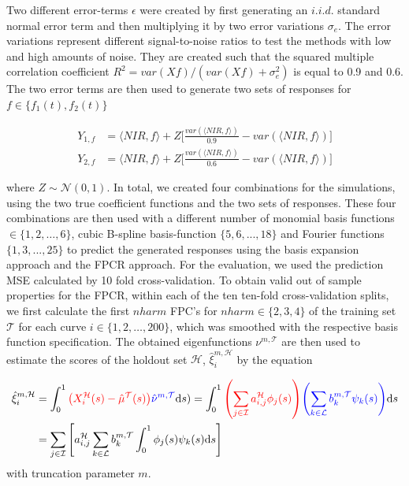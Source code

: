 \documentclass[11pt,twoside,a4paper]{article}
\begin{document}
		 Two different error-terms $\epsilon$ were created by first generating an $i.i.d.$ standard normal error term and then multiplying it by two error variations $\sigma_e $. The error variations represent different signal-to-noise ratios to test the methods with low and high amounts of noise. They are created such that the squared multiple correlation coefficient $R^2 = var(Xf) / (var(Xf) + \sigma^2_{e})$ is equal to 0.9 and 0.6. The two error terms are then used to generate two sets of responses for $f \in \{f_1(t), f_2(t)\}$
		
		\begin{equation}
			\begin{split}
				Y_{1,f} & = \langle NIR, f\rangle + Z  \biggl\lbrack\frac{var(\langle NIR, f\rangle)}{0.9} - var(\langle NIR, f\rangle)\biggr\rbrack \\
				Y_{2,f} & = \langle NIR, f\rangle + Z  \biggl\lbrack\frac{var(\langle NIR, f\rangle)}{0.6} - var(\langle NIR, f\rangle)\biggr\rbrack
			\end{split}
		\end{equation}
		
		where $Z \sim \mathcal{N}(0,1)$. In total, we created four combinations for the simulations, using the two true coefficient functions and the two sets of responses. These four combinations are then used with a different number of monomial basis functions $ \in \{1,2, \dots, 6\}$, cubic B-spline basis-function $\{5,6,...,18\}$ and Fourier functions $\{1,3,...,25\}$ to predict the generated responses using the basis expansion approach and the FPCR approach. For the evaluation, we used the prediction MSE calculated by 10 fold cross-validation.
		To obtain valid out of sample properties for the FPCR, within each of the ten ten-fold cross-validation splits, we first calculate the first $nharm$ FPC's for $nharm \in \{2,3,4\}$ of the training set $\mathcal{T}$ for each curve $i \in \{1,2, \dots, 200\}$, which was smoothed with the respective basis function specification. The obtained eigenfunctions $\nu^{m,\mathcal{T}}$ are then used to estimate the scores of the holdout set $\mathcal{H}$, $\hat{\xi}_{i}^{m, \mathcal{H}}$  by the equation
		 
		\begin{equation}
			\begin{split}
				\hat{\xi}_{i}^{m, \mathcal{H}} &=  \int_{0}^{1} {\color{red} \left(X_{i}^{\mathcal{H}}(s) - \hat{\mu}^{\mathcal{T}}(s)\right)} {\color{blue}\hat{\nu}^{m, \mathcal{T}} }\mathrm{d}s) 
			    = \int_{0}^{1} {\color{red}\left(\sum_{j \in \mathcal{I}} a_{i,j}^{\mathcal{H}} \phi_j(s)\right)} {\color{blue}\left(\sum_{k \in \mathcal{L}} b_{k}^{m, \mathcal{T}} \psi_{k}(s)\right)} \mathrm{d}s \\
				 &= \sum_{j \in \mathcal{I}} \left[ a_{i,j}^{\mathcal{H}}\sum_{k \in \mathcal{L}}  b_{k}^{m, \mathcal{T}} \int_{0}^{1} \phi_j(s) \psi_{k}(s)\mathrm{d}s\right]
			\end{split}
		\end{equation}
		with truncation parameter $m$.
		\vspace{0.2cm}
	
\end{document}
